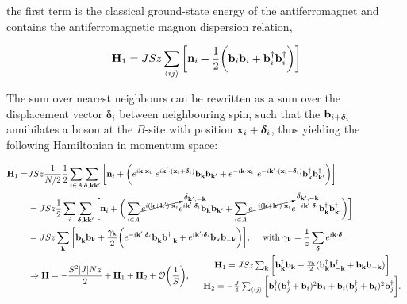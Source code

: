 the first term is the classical ground-state energy of the antiferromagnet and contains the antiferromagnetic magnon dispersion relation, 

\begin{equation}
    {\bf H}_1 = J S z\sum_{\langle ij \rangle} 
    \bigg[
    {\bf n}_i + \frac{1}{2} 
    \bigg(
    {\bf b}_i {\bf b}_i + {\bf b}_i^\dagger {\bf b}_i^\dagger \bigg)
    \bigg] 
\end{equation}

The sum over nearest neighbours can be rewritten as a sum over the displacement vector $\bm{\delta}_{i}$ between neighbouring spin, such that the ${\bf b}_{i + \bm{\delta}_i}$ annihilates a boson at the $B$-site with position ${\bf x}_i + \bm{\delta}_i$, thus yielding the following Hamiltonian in momentum space:

\begin{equation}
\begin{split}
    {\bf H}_1 =& J S z \frac{1}{N/2} \frac{1}{2} \sum_{i \in A} \sum_{{\bm{\delta}, {\bf k k'}}} \bigg[ {\bf n}_i + \bigg(e^{i {\bf k} \cdot {\bf x}_i}\ e^{i {\bf k}' \cdot ({\bf x}_i + \bm{\delta}_i)} {\bf b}_{\bf k} {\bf b}_{\bf k'} + e^{-i {\bf k} \cdot {\bf x}_i}\ e^{-i {\bf k}' \cdot ({\bf x}_i + \bm{\delta}_i)} {\bf b}_{\bf k}^\dagger {\bf b}_{\bf k'}^\dagger \bigg) \bigg] \\
    &= J S z \frac{1}{2} \sum_{i} \sum_{{\bm{\delta}, {\bf k k'}}} 
    \bigg[ 
    {\bf n}_i + \bigg( \sum_{i \in A}
    \cancelto{\delta_{{\bf k',-k}}}{e^{i ({\bf k + k'}) \cdot {\bf x}_i}} e^{i {\bf k}' \cdot
    \bm{\delta}_i} {\bf b}_{\bf k} {\bf b}_{\bf k'} 
    +
    \sum_{i \in A}
    \cancelto{\delta_{{\bf k',-k}}}{e^{-i ({\bf k+k'}) \cdot {\bf x}_i}} e^{-i {\bf k}' \cdot \bm{\delta}_i} {\bf b}_{\bf k}^\dagger {\bf b}_{\bf k'}^\dagger
    \bigg)
    \bigg]  \\
    &= JSz \sum_{{\bf k}} \bigg[ {\bf b}_{{\bf k}}^\dagger {\bf b}_{{\bf k}} + \frac{\gamma_{{\bf k}}}{2} \bigg( e^{-i {\bf k}' \cdot
    \bm{\delta}_i}{\bf b}_{{\bf k}}^\dagger {\bf b}_{-{\bf k}}^\dagger + e^{i {\bf k}' \cdot
    \bm{\delta}_i}{\bf b}_{{\bf k}} {\bf b}_{-{\bf k}}\bigg) \bigg], \quad \textnormal{ with } \gamma_{{\bf k}} = \frac{1}{z} \sum_{\bm{\delta}} e^{i {\bf k} \cdot
    \bm{\delta}}. \\
    &\Rightarrow {\bf H} = -\frac{S^2 |J| N z}{2} + {\bf H}_1 + {\bf H}_2 + \mathcal{O}\bigg(\frac{1}{S}\bigg), \quad \begin{array}{cc}
         {\bf H}_1 = JSz \sum_{{\bf k}} \bigg[ {\bf b}_{{\bf k}}^\dagger {\bf b}_{{\bf k}} + \frac{\gamma_{{\bf k}}}{2} ({\bf b}_{{\bf k}}^\dagger {\bf b}_{-{\bf k}}^\dagger + {\bf b}_{{\bf k}} {\bf b}_{-{\bf k}}) \bigg]  \\
         {\bf H}_2 = - \frac{J}{4} \sum_{\langle ij \rangle} \bigg[{\bf b}_i^\dagger ({\bf b}_j^\dagger + {\bf b}_i)^2 {\bf b}_j + {\bf b}_i ({\bf b}_j^\dagger + {\bf b}_i)^2 {\bf b}_j^\dagger\bigg].
    \end{array}
\end{split}
\end{equation}

